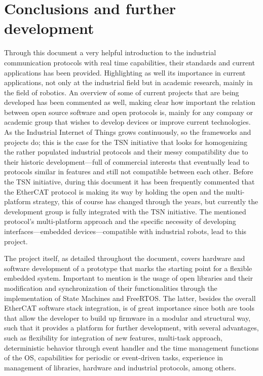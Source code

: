 \chapter{Conclusions and further development}\label{cha:conclusions}

Through this document a very helpful introduction to the industrial communication protocols with real time
capabilities, their standards and current applications has been provided. Highlighting as well its importance 
in current applications, not only at the industrial field but in academic research, mainly in the field of 
robotics. An overview of some of current projects that are being developed has been commented as well, making clear 
how important the relation between open source software and open protocols is, mainly for any company or academic 
group that wishes to develop devices or improve current technologies. As the Industrial Internet of Things grows
continuously, so the frameworks and projects do; this is the case for the TSN initiative that looks for homogenizing
the rather populated industrial protocols and their messy compatibility due to their historic development---full of
commercial interests that eventually lead to protocols similar in features and still not compatible between each other.
Before the TSN initiative, during this document it has been frequently commented that the EtherCAT protocol is making its
way by holding the open and the multi-platform strategy, this of course has changed through the years, but currently
the development group is fully integrated with the TSN initiative.
The mentioned protocol's multi-platform approach and the specific necessity of developing interfaces---embedded devices---compatible
with industrial robots, lead to this project.

The project itself, as detailed throughout the document, covers hardware and software development of a prototype that 
marks the starting point for a flexible embedded system. Important to mention is the usage of open libraries and their 
modification and synchronization of their functionalities through the implementation of State Machines and FreeRTOS. The
latter, besides the overall EtherCAT software stack integration, is of great importance since both are tools that 
allow the developer to build up firmware in a modular and structural way, such that it provides a platform for further development,
with several advantages, such as flexibility for integration of new features, multi-task approach, deterministic behavior 
through event handler and the time management 
functions of the OS, capabilities for periodic or event-driven tasks, experience in management of libraries, hardware and
industrial protocols, among others.

